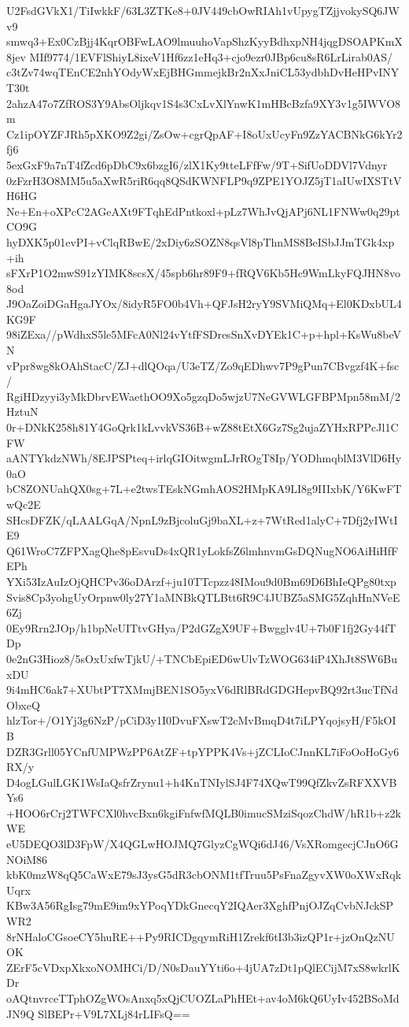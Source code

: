 U2FsdGVkX1/TiIwkkF/63L3ZTKe8+0JV449cbOwRIAh1vUpygTZjjvokySQ6JWv9
smwq3+Ex0CzBjj4KqrOBFwLAO9lmuuhoVapShzKyyBdhxpNH4jqgDSOAPKmX8jev
MIf9774/1EVFlShiyL8ixeV1Hf6zz1eHq3+cjo9ezr0JBp6cu8sR6LrLirab0AS/
c3tZv74wqTEnCE2nhYOdyWxEjBHGmmejkBr2nXxJniCL53ydbhDvHeHPvINYT30t
2ahzA47o7ZfROS3Y9AbsOljkqv1S4s3CxLvXlYnwK1mHBcBzfa9XY3v1g5IWVO8m
Cz1ipOYZFJRh5pXKO9Z2gi/ZsOw+cgrQpAF+I8oUxUcyFn9ZzYACBNkG6kYr2fj6
5exGxF9a7nT4fZcd6pDbC9x6bzgI6/zlX1Ky9tteLFfFw/9T+SifUoDDVl7Vdnyr
0zFzrH3O8MM5u5aXwR5riR6qq8QSdKWNFLP9q9ZPE1YOJZ5jT1aIUwIXSTtVH6HG
Ne+En+oXPcC2AGeAXt9FTqhEdPntkoxl+pLz7WhJvQjAPj6NL1FNWw0q29ptCO9G
hyDXK5p01evPI+vClqRBwE/2xDiy6zSOZN8qsVl8pThnMS8BeISbJJmTGk4xp+ih
sFXrP1O2mwS91zYIMK8scsX/45spb6hr89F9+fRQV6Kb5Hc9WmLkyFQJHN8vo8od
J9OaZoiDGaHgaJYOx/8idyR5FO0b4Vh+QFJsH2ryY9SVMiQMq+El0KDxbUL4KG9F
98iZExa//pWdhxS5le5MFcA0Nl24vYtfFSDresSnXvDYEk1C+p+hpl+KsWu8beVN
vPpr8wg8kOAhStacC/ZJ+dlQOqa/U3eTZ/Zo9qEDhwv7P9gPun7CBvgzf4K+fsc/
RgiHDzyyi3yMkDbrvEWaethOO9Xo5gzqDo5wjzU7NeGVWLGFBPMpn58mM/2HztuN
0r+DNkK258h81Y4GoQrk1kLvvkVS36B+wZ88tEtX6Gz7Sg2ujaZYHxRPPcJl1CFW
aANTYkdzNWh/8EJPSPteq+irlqGIOitwgmLJrROgT8Ip/YODhmqblM3VlD6Hy0aO
bC8ZONUahQX0sg+7L+e2twsTEskNGmhAOS2HMpKA9LI8g9IIIxbK/Y6KwFTwQc2E
SHcsDFZK/qLAALGqA/NpnL9zBjcoluGj9baXL+z+7WtRed1alyC+7Dfj2yIWtIE9
Q61WroC7ZFPXagQhe8pEsvuDs4xQR1yLokfsZ6lmhnvmGsDQNugNO6AiHiHfFEPh
YXi53IzAuIzOjQHCPv36oDArzf+ju10TTcpzz48IMou9d0Bm69D6BhIeQPg80txp
Svis8Cp3yohgUyOrpnw0ly27Y1aMNBkQTLBtt6R9C4JUBZ5aSMG5ZqhHnNVeE6Zj
0Ey9Rrn2JOp/h1bpNeUITtvGHya/P2dGZgX9UF+Bwgglv4U+7b0F1fj2Gy44fTDp
0e2nG3Hioz8/5sOxUxfwTjkU/+TNCbEpiED6wUlvTzWOG634iP4XhJt8SW6BuxDU
9i4mHC6ak7+XUbtPT7XMmjBEN1SO5yxV6dRlBRdGDGHepvBQ92rt3ucTfNdObxeQ
hlzTor+/O1Yj3g6NzP/pCiD3y1I0DvuFXswT2cMvBmqD4t7iLPYqojsyH/F5kOIB
DZR3Grll05YCnfUMPWzPP6AtZF+tpYPPK4Vs+jZCLIoCJnnKL7iFoOoHoGy6RX/y
D4ogLGulLGK1WsIaQsfrZrynu1+h4KnTNIylSJ4F74XQwT99QfZkvZsRFXXVBYs6
+HOO6rCrj2TWFCXl0hvcBxn6kgiFnfwfMQLB0imucSMziSqozChdW/hR1b+z2kWE
eU5DEQO3lD3FpW/X4QGLwHOJMQ7GlyzCgWQi6dJ46/VsXRomgecjCJnO6GNOiM86
kbK0mzW8qQ5CaWxE79sJ3ysG5dR3cbONM1tfTruu5PsFnaZgyvXW0oXWxRqkUqrx
KBw3A56RgIsg79mE9im9xYPoqYDkGnecqY2IQAer3XghfPnjOJZqCvbNJckSPWR2
8rNHaloCGsoeCY5huRE++Py9RICDgqymRiH1Zrekf6tI3b3izQP1r+jzOnQzNUOK
ZErF5cVDxpXkxoNOMHCi/D/N0sDauYYti6o+4jUA7zDt1pQlECijM7xS8wkrlKDr
oAQtnvrceTTphOZgWOsAnxq5xQjCUOZLaPhHEt+av4oM6kQ6UyIv452BSoMdJN9Q
SlBEPr+V9L7XLj84rLIFsQ==
